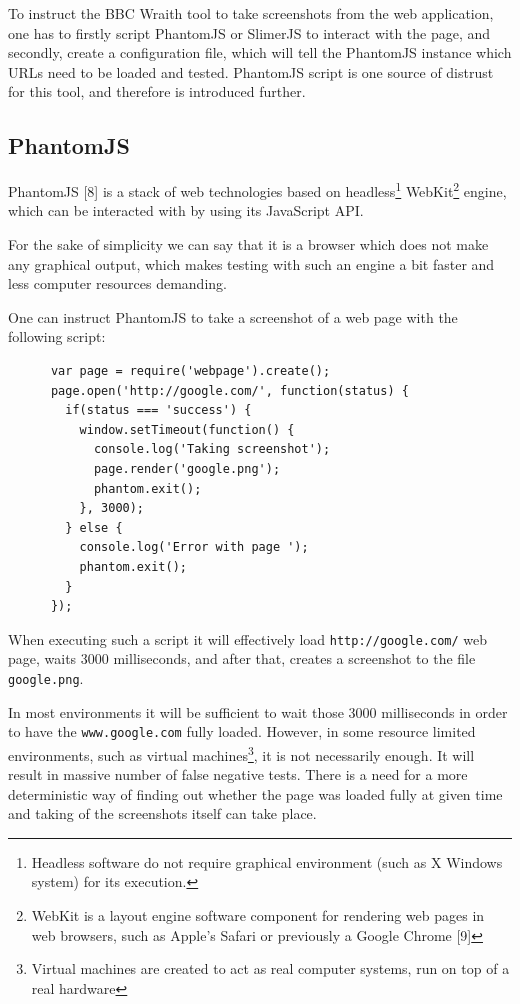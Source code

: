 \documentclass[11pt,oneside,final]{fithesis2}
\begin{document}
  To instruct the BBC Wraith tool to take screenshots from the web application, one has to firstly script PhantomJS or SlimerJS to interact with the page, and secondly, create a 
  configuration file, which will tell the PhantomJS instance which URLs need to be loaded and tested. PhantomJS script is one source of distrust for this tool, and therefore is
  introduced further.
  
    \subsection{PhantomJS}
    \label{subsec:phantomJS}
    PhantomJS [8] is a stack of web technologies based on headless\footnote{Headless software do not require graphical environment (such as X Windows system) for its execution.} 
    WebKit\footnote{WebKit is a layout engine software component for rendering web pages in web browsers, such as Apple's Safari or previously a Google Chrome [9]} engine, which can be 
    interacted with by using its JavaScript API.
    
    For the sake of simplicity we can say that it is a browser which does not make any graphical output, which makes testing with such an engine a bit faster and less computer resources 
    demanding.
    
    One can instruct PhantomJS to take a screenshot of a web page with the following script:
  
    \begin{verbatim}
      var page = require('webpage').create();
      page.open('http://google.com/', function(status) {
        if(status === 'success') {
          window.setTimeout(function() {
            console.log('Taking screenshot');
            page.render('google.png');
            phantom.exit();
          }, 3000);
        } else {
          console.log('Error with page ');
          phantom.exit();
        }
      });
    \end{verbatim}
    
    When executing such a script it will effectively load \texttt{http://google.com/} web page, waits 3000 milliseconds, and after that, creates a screenshot to the file \texttt{google.png}.
    
    In most environments it will be sufficient to wait those 3000 milliseconds in order to have the \texttt{www.google.com} fully loaded. However, in some resource limited environments, 
    such as virtual machines\footnote{Virtual machines are created to act as real computer systems, run on top of a real hardware}, it is not necessarily enough. 
    It will result in massive number of false negative tests. There is a need for a more deterministic way of finding out whether the page was loaded fully at given time and 
    taking of the screenshots itself can take place.
    
\end{document}
